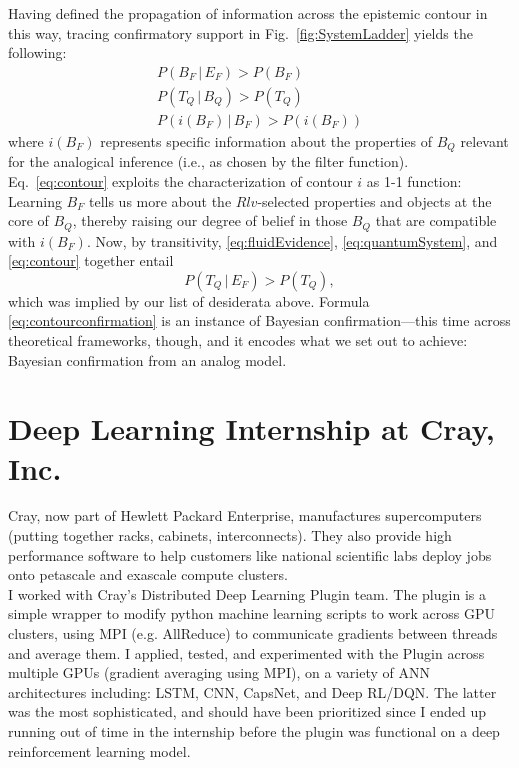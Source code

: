 \documentclass[11pt, oneside]{article}   	%
\begin{document}
Having defined the propagation of information across the epistemic contour in this way, tracing confirmatory support in Fig.\ \ref{fig:SystemLadder} yields the following:
\begin{eqnarray}
P(B_F \,|\, E_F ) > P(B_F)\label{eq:fluidEvidence}\\
P(T_Q \,|\, B_Q ) > P(T_Q)\label{eq:quantumSystem}\\
P(i(B_F) \,|\, B_F ) > P(i(B_F))\label{eq:contour}
\end{eqnarray}
where $i(B_F)$ represents specific information about the properties of $B_Q$ relevant for the analogical inference (i.e., as chosen by the filter function). Eq.\ \ref{eq:contour} exploits the characterization of contour $i$ as 1-1 function: Learning $B_F$ tells us more about the $Rlv$-selected properties and objects at the core of $B_Q$, thereby raising our degree of belief in those $B_Q$ that are compatible with $i(B_F)$. Now, by transitivity, \ref{eq:fluidEvidence}, \ref{eq:quantumSystem}, and \ref{eq:contour} together entail
\begin{equation}
P(T_Q \,|\, E_F ) > P(T_Q),\label{eq:contourconfirmation}
\end{equation}
which was implied by our list of desiderata above.  Formula \ref{eq:contourconfirmation} is an instance of Bayesian confirmation---this time across theoretical frameworks, though, and it encodes what we set out to achieve: Bayesian confirmation from an analog model.



\section{Deep Learning Internship at Cray, Inc.}

\noindent Cray, now part of Hewlett Packard Enterprise,  manufactures supercomputers (putting together racks, cabinets, interconnects). They also provide high performance software to help customers like national scientific labs deploy jobs onto petascale and exascale compute clusters. \\

\noindent I worked with Cray's Distributed Deep Learning Plugin team. The plugin is a simple wrapper to modify python machine learning scripts to work across GPU clusters, using MPI (e.g. AllReduce) to communicate gradients between threads and average them.  I applied, tested, and experimented with the Plugin across multiple GPUs (gradient averaging using MPI), on a variety of ANN architectures including: LSTM, CNN, CapsNet, and Deep RL/DQN.  The latter was the most sophisticated, and should have been prioritized since I ended up running out of time in the internship before the plugin was functional on a deep reinforcement learning model. \\
\end{document}
